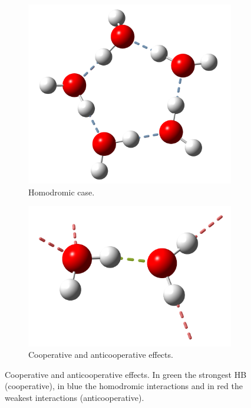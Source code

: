 \begin{figure}[h]
  \centering
  \begin{subfigure}[b]{0.43\linewidth}
    \includegraphics[width=\linewidth]{2/img/pentamero}
    \caption{Homodromic case.}
    \label{pentamero}
  \end{subfigure}
    \begin{subfigure}[b]{0.43\linewidth}
    \includegraphics[width=\linewidth]{2/img/dimero_b}
    \caption{Cooperative and anticooperative effects.}
    \label{coo_anti}
  \end{subfigure}
  \caption{Cooperative and anticooperative effects. In green the strongest HB
  (cooperative), in blue the homodromic interactions and in red the weakest
  interactions (anticooperative).}
  \label{fig_coop}
\end{figure}

